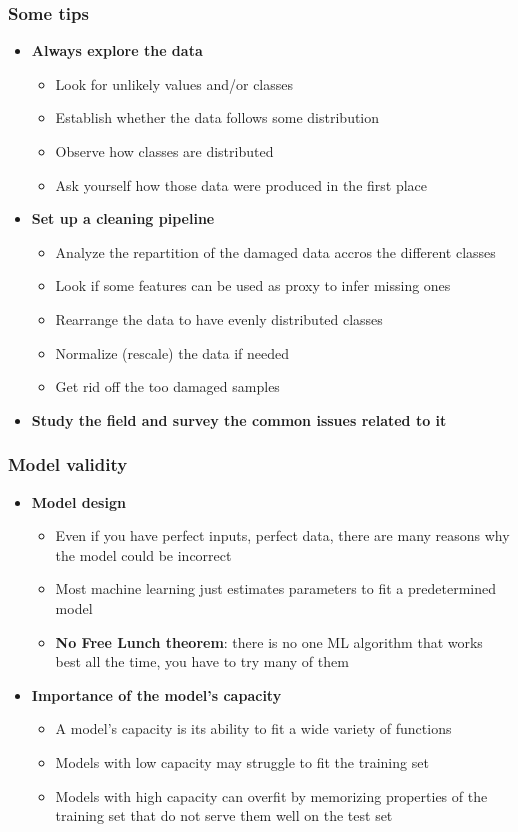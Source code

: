 \documentclass{beamer}
\begin{document}
\begin{frame}\frametitle{Some tips}
\begin{itemize}
	\setlength\itemsep{1em}
	\item {\bf Always explore the data}
	\begin{itemize}
		\item Look for unlikely values and/or classes
		\item Establish whether the data follows some distribution
		\item Observe how classes are distributed
		\item Ask yourself how those data were produced in the first place
	\end{itemize}
	\item {\bf Set up a cleaning pipeline}
	\begin{itemize}
		\item Analyze the repartition of the damaged data accros the different classes
		\item Look if some features can be used as proxy to infer missing ones
		\item Rearrange the data to have evenly distributed classes
		\item Normalize (rescale) the data if needed
		\item Get rid off the too damaged samples
	\end{itemize}
	\item {\bf Study the field and survey the common issues related to it}
\end{itemize}
\end{frame}

\begin{frame}\frametitle{Model validity}
\begin{itemize}
	\setlength\itemsep{1em}
	\item {\bf Model design}
	\begin{itemize}
		\item Even if you have perfect inputs, perfect data, there are many reasons why the model could be incorrect
		\item Most machine learning just estimates parameters to fit a predetermined model
		\item {\bf No Free Lunch theorem}: there is no one ML algorithm that works best all the time, you have to try many of them
	\end{itemize}
	\item {\bf Importance of the model's capacity}
	\begin{itemize}
		\item A model's capacity is its ability to fit a wide variety of functions
		\item Models with low capacity may struggle to fit the training set
		\item Models with high capacity can overfit by memorizing properties of the training set that do not serve them well on the test set
	\end{itemize}
\end{itemize}
\end{frame}
\end{document}

